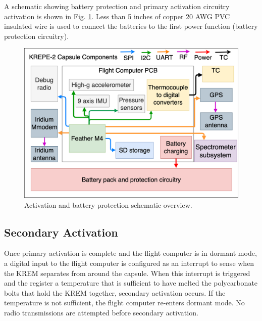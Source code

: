 \documentclass{article}
\begin{document}
A schematic showing battery protection and primary activation circuitry activation is shown in Fig. \ref{fig:activation-circuitry}. Less than 5 inches of copper 20 AWG PVC insulated wire is used to connect the batteries to the first power function (battery protection circuitry).




\begin{figure}[H]
    \centering
    \includegraphics[width=12cm]{images/krepe2-avionics.png}
    \caption{Activation and battery protection schematic overview.}
    \label{fig:activation-circuitry}
\end{figure}







\subsection{Secondary Activation}
\label{sec:secondary-activation}
Once primary activation is complete and the flight computer is in dormant mode, a digital input to the flight computer is configured as an interrupt to sense when the KREM separates from around the capsule. When this interrupt is triggered and the  register a temperature that is sufficient to have melted the polycarbonate bolts that hold the KREM together, secondary activation occurs. If the temperature is not sufficient, the flight computer re-enters dormant mode. No radio transmissions are attempted before secondary activation. 
\end{document}
